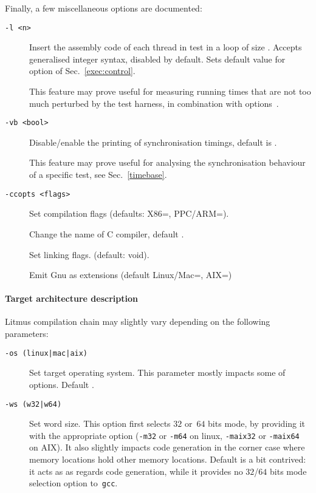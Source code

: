Finally, a few miscellaneous options are documented:
\begin{description}
\item[{\tt -l <n>}]
Insert the assembly code of each thread in test in a loop of size .
Accepts generalised integer syntax, disabled by default.
Sets default value for option  of Sec.~\ref{exec:control}.

This feature may prove useful for measuring running times that are not
too much perturbed by the test harness, in combination
with options~.
\item[{\tt -vb <bool>}]
Disable/enable the printing of synchronisation timings, default is .

This feature may prove useful for analysing the synchronisation behaviour of
a specific test, see Sec.~\ref{timebase}.
\item[{\tt -ccopts <flags>}] Set  compilation flags
(defaults: X86=, PPC/ARM=).
\item[]
Change the name of C compiler, default .
\item[] Set  linking flags.
(default: void).
\item[]
Emit Gnu as extensions  (default Linux/Mac=, AIX=)
\end{description}

\paragraph*{Target architecture description}
Litmus compilation chain may slightly vary depending on the following
parameters:
\begin{description}
\item[{\tt -os (linux|mac|aix)}] Set target operating system.
This parameter mostly impacts some of  options. Default .
\item[{\tt -ws (w32|w64)}] Set word size.
This option first selects  $32$ or~$64$ bits mode,
by providing it with the appropriate option (\texttt{-m32}
or \texttt{-m64} on linux, \texttt{-maix32}
or \texttt{-maix64} on AIX).
It also slightly impacts code generation in the corner case
where memory locations hold other memory locations.
Default is a bit contrived: it acts as  as regards code
generation, while it provides no $32$/$64$ bits mode selection option
to~\texttt{gcc}.
\end{description}

